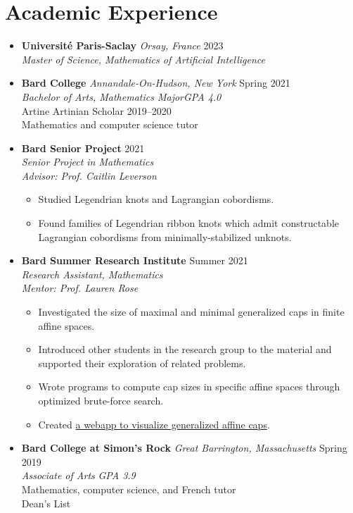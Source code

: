 \documentclass[12pt,letterpaper]{article}
\newenvironment{explist}
{\begin{itemize}[label=\textbf{--},itemsep=1pt,topsep=0pt,partopsep=0pt,parsep=0pt]}
{\end{itemize}}
\begin{document}
\section*{Academic Experience}
\begin{itemize}[label=]
    \item
        \textbf{Université Paris-Saclay} \textit{Orsay, France} \hfill 2023\\
        \textit{Master of Science, Mathematics of Artificial Intelligence}

    \item
        \textbf{Bard College} \textit{Annandale-On-Hudson, New York} \hfill Spring 2021\\
        \textit{Bachelor of Arts, Mathematics Major}\hfill \textit{GPA 4.0}\\
        Artine Artinian Scholar 2019--2020\\
        Mathematics and computer science tutor

    \item
        \textbf{Bard Senior Project} \hfill 2021\\
        \textit{Senior Project in Mathematics}\\
        \textit{Advisor: Prof. Caitlin Leverson}
        \begin{explist}
        \item Studied Legendrian knots and Lagrangian cobordisms.
        \item Found families of Legendrian ribbon knots which admit constructable Lagrangian cobordisms from minimally-stabilized unknots.
        \end{explist}

    \item
        \textbf{Bard Summer Research Institute} \hfill Summer 2021\\
        \textit{Research Assistant, Mathematics}\\
        \textit{Mentor: Prof. Lauren Rose}
        \begin{explist}
        \item Investigated the size of maximal and minimal generalized caps in finite affine spaces.
        \item Introduced other students in the research group to the material and supported their exploration of related problems.
        \item Wrote programs to compute cap sizes in specific affine spaces through optimized brute-force search.
        \item Created \href{https://slickytail.github.io/QuadsVis/index.html}{a webapp to visualize generalized affine caps}.
        \end{explist}

    \item
        \textbf{Bard College at Simon's Rock} \textit{Great Barrington, Massachusetts} \hfill Spring 2019\\
        \textit{Associate of Arts} \hfill \textit{GPA 3.9}\\
        Mathematics, computer science, and French tutor\\
        Dean's List

\end{itemize}
\end{document}
